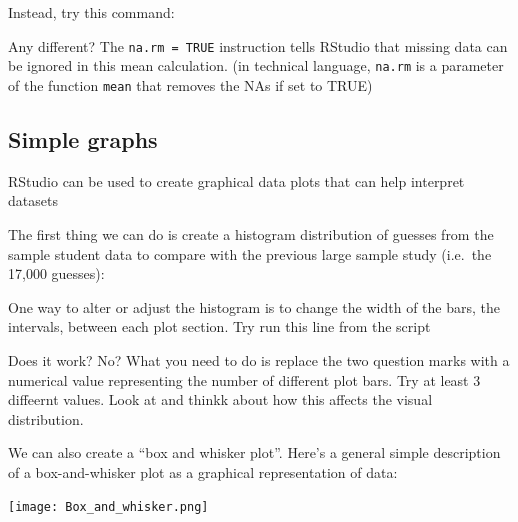 \documentclass[
]{book}
\newenvironment{Shaded}{\begin{snugshade}}{\end{snugshade}}
\newcommand{\AttributeTok}[1]{\textcolor[rgb]{0.77,0.63,0.00}{#1}}
\newcommand{\ConstantTok}[1]{\textcolor[rgb]{0.00,0.00,0.00}{#1}}
\newcommand{\FunctionTok}[1]{\textcolor[rgb]{0.00,0.00,0.00}{#1}}
\newcommand{\NormalTok}[1]{#1}
\newcommand{\SpecialCharTok}[1]{\textcolor[rgb]{0.00,0.00,0.00}{#1}}
\begin{document}
Instead, try this command:

\begin{Shaded}
\end{Shaded}

Any different? The \texttt{na.rm\ =\ TRUE} instruction tells RStudio that missing data can be ignored in this mean calculation. (in technical language, \texttt{na.rm} is a parameter of the function \texttt{mean} that removes the NAs if set to TRUE)

\hypertarget{simple-graphs}{%
\subsection{Simple graphs}\label{simple-graphs}}

RStudio can be used to create graphical data plots that can help interpret datasets

The first thing we can do is create a histogram distribution of guesses from the sample student data to compare with the previous large sample study (i.e.~the 17,000 guesses):

\begin{Shaded}
\end{Shaded}

One way to alter or adjust the histogram is to change the width of the bars, the intervals, between each plot section. Try run this line from the script

\begin{Shaded}
\end{Shaded}

Does it work? No? What you need to do is replace the two question marks with a numerical value representing the number of different plot bars. Try at least 3 diffeernt values. Look at and thinkk about how this affects the visual distribution.

We can also create a ``box and whisker plot''. Here's a general simple description of a box-and-whisker plot as a graphical representation of data:

\texttt{[image: Box\_and\_whisker.png]}
\end{document}
